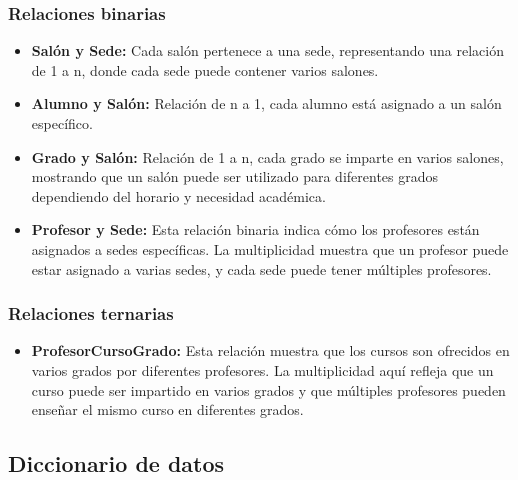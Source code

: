 \subsubsection{Relaciones binarias}
\begin{itemize}
	\item \textbf{Salón y Sede:} Cada salón pertenece a una sede, representando una relación de 1 a n, donde cada sede puede contener varios salones.
	\item \textbf{Alumno y Salón:} Relación de n a 1, cada alumno está asignado a un salón específico.
	\item \textbf{Grado y Salón:} Relación de 1 a n, cada grado se imparte en varios salones, mostrando que un salón puede ser utilizado para diferentes grados dependiendo del horario y necesidad académica.
	\item \textbf{Profesor y Sede:} Esta relación binaria indica cómo los profesores están asignados a sedes específicas. La multiplicidad muestra que un profesor puede estar asignado a varias sedes, y cada sede puede tener múltiples profesores.
\end{itemize}
\subsubsection{Relaciones ternarias}
\begin{itemize}
	\item \textbf{ProfesorCursoGrado:} Esta relación muestra que los cursos son ofrecidos en varios grados por diferentes profesores. La multiplicidad aquí refleja que un curso puede ser impartido en varios grados y que múltiples profesores pueden enseñar el mismo curso en diferentes grados.
\end{itemize}
\subsection{Diccionario de datos}















